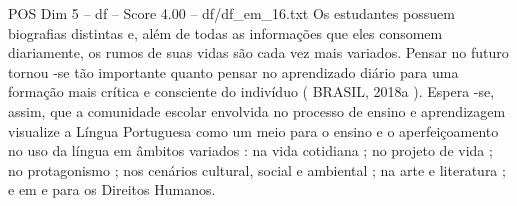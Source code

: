 \begin{textsample}{POS Dim 5 – df – Score 4.00 – df/df\_em\_16.txt}
Os estudantes possuem biografias distintas e, além de todas as informações que eles consomem diariamente, os rumos de suas vidas são cada vez mais variados.
Pensar no futuro tornou -se tão importante quanto pensar no aprendizado diário para uma formação mais crítica e consciente do indivíduo ( BRASIL, 2018a ).
Espera -se, assim, que a comunidade escolar envolvida no processo de ensino e aprendizagem visualize a Língua Portuguesa como um meio para o ensino e o aperfeiçoamento no uso da língua em âmbitos variados : na vida cotidiana ; no projeto de vida ; no protagonismo ; nos cenários cultural, social e ambiental ; na arte e literatura ; e em e para os Direitos Humanos.

\end{textsample}
